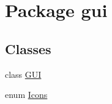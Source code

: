 \hypertarget{namespacegui}{\section{Package gui}
\label{namespacegui}
}
\subsection*{Classes}
\begin{DoxyCompactItemize}
\item 
class \hyperlink{classgui_1_1_g_u_i}{G\-U\-I}
\item 
enum \hyperlink{enumgui_1_1_icons}{Icons}
\end{DoxyCompactItemize}
